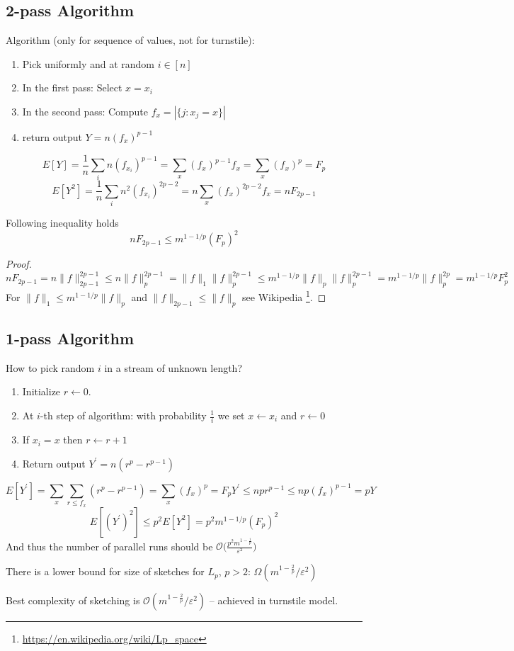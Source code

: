 \documentclass[11pt]{article}
\begin{document}
\subsection{2-pass Algorithm}
Algorithm (only for sequence of values, not for turnstile):
  \begin{enumerate}
    \item Pick uniformly and at random $i \in [n]$
    \item In the first pass: Select $x = x_i$
    \item In the second pass: Compute $f_{x} = |\{ j : x_j = x \}|$
    \item return output $Y = n (f_x)^{p-1}$
  \end{enumerate}
$$E[Y] = \frac{1}{n}\sum_{i} n(f_{x_i})^{p-1} = \sum_{x} (f_x)^{p-1} f_x = \sum_{x} (f_x)^p = F_p$$
$$E[Y^2] = \frac{1}{n}\sum_{i}n^2 (f_{x_i})^{2p-2} = n \sum_{x} (f_x)^{2p-2} f_x = n F_{2p-1}$$

\begin{claim}
  Following inequality holds $$n F_{2p-1} \leq m^{1-1/p} (F_p)^2$$
\end{claim}
\begin{proof}
$$nF_{2p-1} = n \|f\|_{2p-1}^{2p-1} \leq n \|f\|_{p}^{2p-1} = \|f\|_1 \|f\|_p^{2p-1} \leq m^{1 - 1/p} \|f\|_p \|f\|_p^{2p-1} = m^{1 - 1/p} \|f\|_p^{2p} = m^{1 - 1/p} F_p^2$$
For $\|f\|_1 \leq m^{1 - 1/p} \|f\|_p$ and $\|f\|_{2p-1} \le \|f\|_p$ see Wikipedia \footnote{\url{https://en.wikipedia.org/wiki/Lp_space}}.
\end{proof}
\subsection{1-pass Algorithm}
How to pick random $i$ in a stream of unknown length?
\begin{enumerate}
  \item Initialize $r \gets 0$.
  \item At $i$-th step of algorithm: with probability $\frac{1}{i}$ we set $x \gets x_i$ and $r \gets 0$
  \item If $x_{i} = x$ then $r \gets r + 1$
  \item Return output $Y^\prime = n(r^p - r^{p-1})$
\end{enumerate}
$$E[Y^\prime] = \sum_x \sum_{r \leq f_x} (r^p-r^{p-1}) = \sum_x (f_x)^p = F_p
Y^\prime \leq n p r^{p-1} \leq n p (f_x)^{p-1} = p Y$$
$$E[(Y^\prime)^2] \leq p^2 E[Y^2] = p^2 m^{1-1/p} (F_p)^2$$
And thus the number of parallel runs should be $\mathcal{O}\Big(\frac{p^2 m^{1 - \frac{1}{p}}}{\varepsilon^2}\Big)$

\begin{fact}
  There is a lower bound for size of sketches for $L_p$, $p > 2$: $\Omega(m^{1-\frac{2}{p}}/\varepsilon^2)$ \cite{DBLP:journals/jcss/Bar-YossefJKS04}
\end{fact}
\begin{fact}
  Best complexity of sketching is $\mathcal{O}(m^{1-\frac{2}{p}}/\varepsilon^2)$ -- achieved in turnstile model. \cite{DBLP:conf/stoc/IndykW05}
\end{fact}



\end{document}
